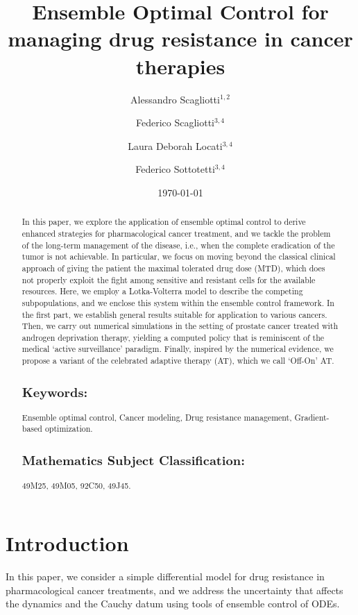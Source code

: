 \documentclass[a4paper,12pt, reqno]{amsart}
\title[Ensemble Optimal Control for drug resistance in cancer therapies]{Ensemble Optimal Control for managing drug resistance in cancer therapies}
\author[A. Scagliotti]{Alessandro Scagliotti$^{1,2}$}%
\author[F. Scagliotti]{Federico Scagliotti$^{3,4}$}
\author[L.D. Locati]{Laura Deborah Locati$^{3,4}$}
\author[F. Sottotetti]{Federico Sottotetti$^{3,4}$}
\date{\today}
\theoremstyle{plain}
\theoremstyle{definition}
\theoremstyle{remark}
\numberwithin{equation}{section}
\begin{document}
\maketitle

\begin{abstract}
    In this paper, we explore the application of ensemble optimal control to derive enhanced strategies for pharmacological cancer treatment, and we tackle the problem of the long-term management of the disease, i.e., when the complete eradication of the tumor is not achievable.
In particular, we focus on moving beyond the classical clinical approach of giving the patient the maximal tolerated drug dose (MTD), which does not properly exploit the fight among sensitive and resistant cells for the available resources.
Here, we employ a Lotka-Volterra model to describe the competing subpopulations, and we enclose this system within the ensemble control framework.
In the first part, we establish general results suitable for application to various cancers.
Then, we carry out numerical simulations in the setting of prostate cancer treated with androgen deprivation therapy, yielding a computed policy that is reminiscent of the medical `active surveillance' paradigm.
Finally, inspired by the numerical evidence, we propose a variant of the celebrated adaptive therapy (AT), which we call `Off-On' AT.


    \subsection*{Keywords:} Ensemble optimal control, Cancer modeling, Drug resistance management, Gradient-based optimization.

    \subsection*{Mathematics Subject Classification:}
49M25, 49M05, 92C50, 49J45.

\end{abstract}



\section{Introduction} \label{sec:intro}

In this paper, we consider a simple differential model for drug resistance in pharmacological cancer treatments, and we address the uncertainty that affects the dynamics and the Cauchy datum using tools of ensemble control of ODEs.
\end{document}
